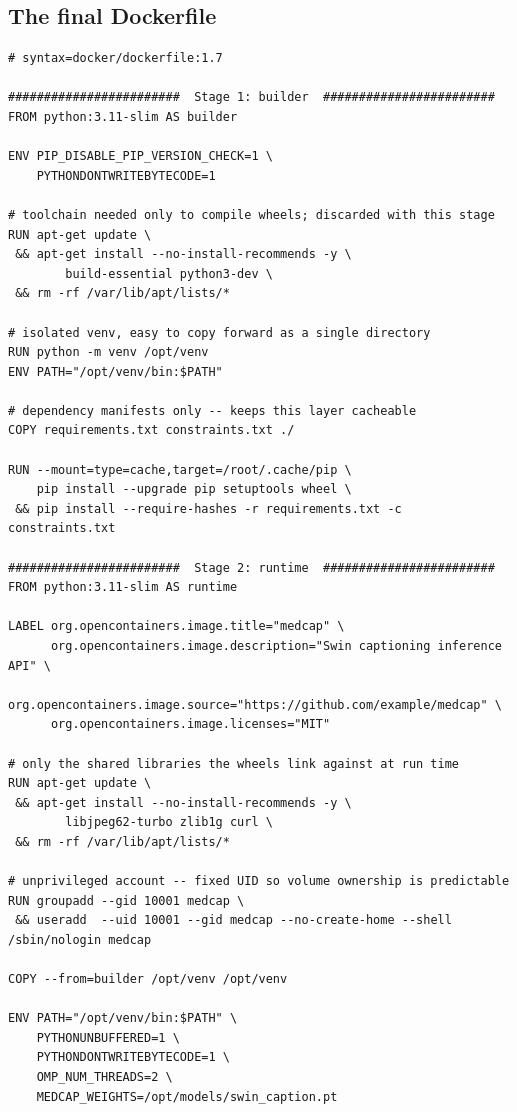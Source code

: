 \documentclass[10pt,a4paper]{article}
\begin{document}
\subsection{The final Dockerfile}

\begin{lstlisting}[style=dfile,caption={\texttt{Dockerfile} --- the production build.}]
# syntax=docker/dockerfile:1.7

########################  Stage 1: builder  ########################
FROM python:3.11-slim AS builder

ENV PIP_DISABLE_PIP_VERSION_CHECK=1 \
    PYTHONDONTWRITEBYTECODE=1

# toolchain needed only to compile wheels; discarded with this stage
RUN apt-get update \
 && apt-get install --no-install-recommends -y \
        build-essential python3-dev \
 && rm -rf /var/lib/apt/lists/*

# isolated venv, easy to copy forward as a single directory
RUN python -m venv /opt/venv
ENV PATH="/opt/venv/bin:$PATH"

# dependency manifests only -- keeps this layer cacheable
COPY requirements.txt constraints.txt ./

RUN --mount=type=cache,target=/root/.cache/pip \
    pip install --upgrade pip setuptools wheel \
 && pip install --require-hashes -r requirements.txt -c constraints.txt

########################  Stage 2: runtime  ########################
FROM python:3.11-slim AS runtime

LABEL org.opencontainers.image.title="medcap" \
      org.opencontainers.image.description="Swin captioning inference API" \
      org.opencontainers.image.source="https://github.com/example/medcap" \
      org.opencontainers.image.licenses="MIT"

# only the shared libraries the wheels link against at run time
RUN apt-get update \
 && apt-get install --no-install-recommends -y \
        libjpeg62-turbo zlib1g curl \
 && rm -rf /var/lib/apt/lists/*

# unprivileged account -- fixed UID so volume ownership is predictable
RUN groupadd --gid 10001 medcap \
 && useradd  --uid 10001 --gid medcap --no-create-home --shell /sbin/nologin medcap

COPY --from=builder /opt/venv /opt/venv

ENV PATH="/opt/venv/bin:$PATH" \
    PYTHONUNBUFFERED=1 \
    PYTHONDONTWRITEBYTECODE=1 \
    OMP_NUM_THREADS=2 \
    MEDCAP_WEIGHTS=/opt/models/swin_caption.pt


\end{lstlisting}
\end{document}
